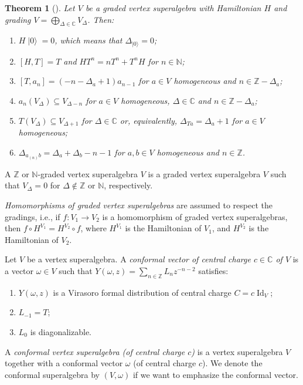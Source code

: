 \documentclass[a4paper, 12pt, reqno]{amsart}
\newtheorem{theorem}{Theorem}[section]
\theoremstyle{remark}
\DeclareMathOperator{\Id}{Id}
\DeclareMathOperator{\vac}{|0\rangle}
\begin{document}
\begin{theorem}[{\cite[\S4.9]{kac_vertex_1998}}]
  \label{thr:20}
  Let $V$ be a graded vertex superalgebra with Hamiltonian $H$ and grading $V = \bigoplus_{\Delta \in \mathbb{C}}V_{\Delta}$.
  Then:
  \begin{enumerate}
  \item $H\vac = 0$, which means that $\Delta_{\vac} = 0$;
  \item $[H, T] = T$ and $HT^n = nT^n + T^nH$ for $n \in \mathbb{N}$;
  \item $[T, a_n] = (-n - \Delta_a + 1)a_{n - 1}$ for $a \in V$ homogeneous and $n \in \mathbb{Z} - \Delta_a$;
  \item $a_n(V_{\Delta}) \subseteq V_{\Delta - n}$ for $a \in V$ homogeneous, $\Delta \in \mathbb{C}$ and $n \in \mathbb{Z} - \Delta_a$;
  \item $T(V_{\Delta}) \subseteq V_{\Delta + 1}$ for $\Delta \in \mathbb{C}$ or, equivalently, $\Delta_{Ta} = \Delta_a + 1$ for $a \in V$ homogeneous;
  \item $\Delta_{a_{(n)}b} = \Delta_a + \Delta_b - n - 1$ for $a, b \in V$ homogeneous and $n \in \mathbb{Z}$.
  \end{enumerate}
\end{theorem}

A $\mathbb{Z}$ or $\mathbb{N}$-graded vertex superalgebra $V$ is a graded vertex superalgebra $V$ such that $V_{\Delta} = 0$ for $\Delta \notin \mathbb{Z}$ or $\mathbb{N}$, respectively.

\emph{Homomorphisms of graded vertex superalgebras} are assumed to respect the gradings, i.e., if $f: V_1 \to V_2$ is a homomorphism of graded vertex superalgebras, then $f\circ H^{V_1} = H^{V_2}\circ f$, where $H^{V_1}$ is the Hamiltonian of $V_1$, and $H^{V_2}$ is the Hamiltonian of $V_2$.

Let $V$ be a vertex superalgebra.
A \emph{conformal vector of central charge $c \in \mathbb{C}$ of $V$} is a vector $\omega \in V$ such that $Y(\omega, z) = \sum_{n \in \mathbb{Z}}L_nz^{-n - 2}$ satisfies:
\begin{enumerate}
\item $Y(\omega, z)$ is a Virasoro formal distribution of central charge $C = c\Id_V$;
\item $L_{-1} = T$;
\item $L_0$ is diagonalizable.
\end{enumerate}

A \emph{conformal vertex superalgebra (of central charge $c$)} is a vertex superalgebra $V$ together with a conformal vector $\omega$ (of central charge $c$).
We denote the conformal superalgebra by $(V, \omega)$ if we want to emphasize the conformal vector.
\end{document}
